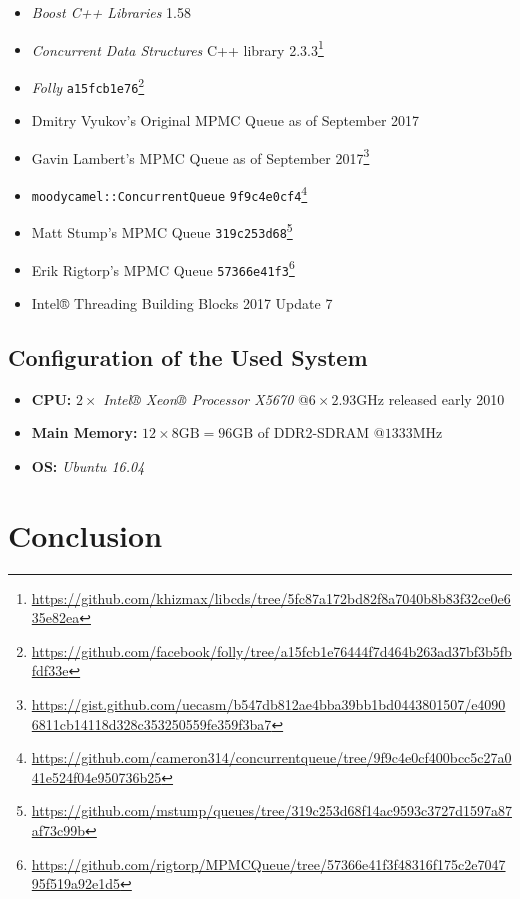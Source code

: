 \begin{@empty}
    \begin{itemize}
        \itemsep0em
        \item \textit{Boost C++ Libraries} 1.58
        \item \textit{Concurrent Data Structures} C++ library 2.3.3\footnote{\url{https://github.com/khizmax/libcds/tree/5fc87a172bd82f8a7040b8b83f32ce0e635e82ea}}
        \item \textit{Folly} \lstinline{a15fcb1e76}\footnote{\url{https://github.com/facebook/folly/tree/a15fcb1e76444f7d464b263ad37bf3b5fbfdf33e}}
        \item Dmitry Vyukov's Original MPMC Queue as of September 2017
        \item Gavin Lambert's MPMC Queue as of September 2017\footnote{\url{https://gist.github.com/uecasm/b547db812ae4bba39bb1bd0443801507/e40906811cb14118d328c353250559fe359f3ba7}}
        \item \lstinline{moodycamel::ConcurrentQueue} \lstinline{9f9c4e0cf4}\footnote{\url{https://github.com/cameron314/concurrentqueue/tree/9f9c4e0cf400bcc5c27a041e524f04e950736b25}}
        \item Matt Stump's MPMC Queue \lstinline{319c253d68}\footnote{\url{https://github.com/mstump/queues/tree/319c253d68f14ac9593c3727d1597a87af73c99b}}
        \item Erik Rigtorp's MPMC Queue \lstinline{57366e41f3}\footnote{\url{https://github.com/rigtorp/MPMCQueue/tree/57366e41f3f48316f175c2e704795f519a92e1d5}}
        \item Intel® Threading Building Blocks 2017 Update 7
    \end{itemize}
\end{@empty}

\subsection[System Configuration]{Configuration of the Used System}

\begin{@empty}
    \begin{itemize}
        \itemsep0em
        \item \textbf{CPU:} $2 \times $ \emph{Intel® Xeon® Processor X5670} @$6 \times 2.93\text{GHz}$ released early 2010
        \item \textbf{Main Memory:} $12 \times 8\text{GB} = 96\text{GB}$ of DDR2-SDRAM @$1333\text{MHz}$
        \item \textbf{OS:} \emph{Ubuntu 16.04}
    \end{itemize}
\end{@empty}

\section{Conclusion}
